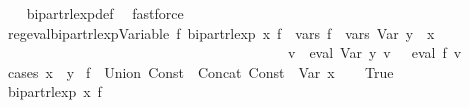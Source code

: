\begin{isabellebody}
%
\isadelimproof
\ \ %
\endisadelimproof
%
\isatagproof
{}\isamarkupfalse%
\ bipart{\isacharunderscore}{\kern0pt}rlexp{\isacharunderscore}{\kern0pt}def\ \isamarkupfalse%
\ fastforce%
\endisatagproof
{\isafoldproof}%
%
\isadelimproof
\isanewline
%
\endisadelimproof
\isanewline
\isanewline
{}\isamarkupfalse%
\ reg{\isacharunderscore}{\kern0pt}eval{\isacharunderscore}{\kern0pt}bipart{\isacharunderscore}{\kern0pt}rlexp{\isacharunderscore}{\kern0pt}Variable{\isacharcolon}{\kern0pt}\ {\isachardoublequoteopen}{\isasymexists}f{\isacharprime}{\kern0pt}{\isachardot}{\kern0pt}\ bipart{\isacharunderscore}{\kern0pt}rlexp\ x\ f{\isacharprime}{\kern0pt}\ {\isasymand}\ vars\ f{\isacharprime}{\kern0pt}\ {\isacharequal}{\kern0pt}\ vars\ {\isacharparenleft}{\kern0pt}Var\ y{\isacharparenright}{\kern0pt}\ {\isasymunion}\ {\isacharbraceleft}{\kern0pt}x{\isacharbraceright}{\kern0pt}\isanewline
\ \ \ \ \ \ \ \ \ \ \ \ \ \ \ \ \ \ \ \ \ \ \ \ \ \ \ \ \ \ \ \ \ \ \ \ \ \ \ \ {\isasymand}\ {\isacharparenleft}{\kern0pt}{\isasymforall}v{\isachardot}{\kern0pt}\ {\isasymPsi}\ {\isacharparenleft}{\kern0pt}eval\ {\isacharparenleft}{\kern0pt}Var\ y{\isacharparenright}{\kern0pt}\ v{\isacharparenright}{\kern0pt}\ {\isacharequal}{\kern0pt}\ {\isasymPsi}\ {\isacharparenleft}{\kern0pt}eval\ f{\isacharprime}{\kern0pt}\ v{\isacharparenright}{\kern0pt}{\isacharparenright}{\kern0pt}{\isachardoublequoteclose}\isanewline
%
\isadelimproof
%
\endisadelimproof
%
\isatagproof
{}\isamarkupfalse%
\ {\isacharparenleft}{\kern0pt}cases\ {\isachardoublequoteopen}x\ {\isacharequal}{\kern0pt}\ y{\isachardoublequoteclose}{\isacharparenright}{\kern0pt}\isanewline
{}\isamarkupfalse%
\ {\isacharquery}{\kern0pt}f{\isacharprime}{\kern0pt}\ {\isacharequal}{\kern0pt}\ {\isachardoublequoteopen}Union\ {\isacharparenleft}{\kern0pt}Const\ {\isacharbraceleft}{\kern0pt}{\isacharbraceright}{\kern0pt}{\isacharparenright}{\kern0pt}\ {\isacharparenleft}{\kern0pt}Concat\ {\isacharparenleft}{\kern0pt}Const\ {\isacharbraceleft}{\kern0pt}{\isacharbrackleft}{\kern0pt}{\isacharbrackright}{\kern0pt}{\isacharbraceright}{\kern0pt}{\isacharparenright}{\kern0pt}\ {\isacharparenleft}{\kern0pt}Var\ x{\isacharparenright}{\kern0pt}{\isacharparenright}{\kern0pt}{\isachardoublequoteclose}\isanewline
\ \ \isamarkupfalse%
\ True\isanewline
\ \ \isamarkupfalse%
\ \isamarkupfalse%
\ {\isachardoublequoteopen}bipart{\isacharunderscore}{\kern0pt}rlexp\ x\ {\isacharquery}{\kern0pt}f{\isacharprime}{\kern0pt}{\isachardoublequoteclose}\isanewline

\end{isabellebody}
